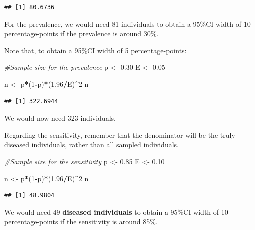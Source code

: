 \documentclass[
]{book}
\newenvironment{Shaded}{\begin{snugshade}}{\end{snugshade}}
\newcommand{\CommentTok}[1]{\textcolor[rgb]{0.56,0.35,0.01}{\textit{#1}}}
\newcommand{\DecValTok}[1]{\textcolor[rgb]{0.00,0.00,0.81}{#1}}
\newcommand{\FloatTok}[1]{\textcolor[rgb]{0.00,0.00,0.81}{#1}}
\newcommand{\NormalTok}[1]{#1}
\newcommand{\OtherTok}[1]{\textcolor[rgb]{0.56,0.35,0.01}{#1}}
\newcommand{\SpecialCharTok}[1]{\textcolor[rgb]{0.81,0.36,0.00}{\textbf{#1}}}
\begin{document}
\begin{verbatim}
## [1] 80.6736
\end{verbatim}

For the prevalence, we would need 81 individuals to obtain a 95\%CI width of 10 percentage-points if the prevalence is around 30\%.

Note that, to obtain a 95\%CI width of 5 percentage-points:

\begin{Shaded}
\begin{Highlighting}[]
\CommentTok{\#Sample size for the prevalence}
\NormalTok{p }\OtherTok{\textless{}{-}} \FloatTok{0.30}
\NormalTok{E }\OtherTok{\textless{}{-}} \FloatTok{0.05}

\NormalTok{n }\OtherTok{\textless{}{-}}\NormalTok{ p}\SpecialCharTok{*}\NormalTok{(}\DecValTok{1}\SpecialCharTok{{-}}\NormalTok{p)}\SpecialCharTok{*}\NormalTok{(}\FloatTok{1.96}\SpecialCharTok{/}\NormalTok{E)}\SpecialCharTok{\^{}}\DecValTok{2}
\NormalTok{n}
\end{Highlighting}
\end{Shaded}

\begin{verbatim}
## [1] 322.6944
\end{verbatim}

We would now need 323 individuals.

Regarding the sensitivity, remember that the denominator will be the truly diseased individuals, rather than all sampled individuals.

\begin{Shaded}
\begin{Highlighting}[]
\CommentTok{\#Sample size for the sensitivity}
\NormalTok{p }\OtherTok{\textless{}{-}} \FloatTok{0.85}
\NormalTok{E }\OtherTok{\textless{}{-}} \FloatTok{0.10}

\NormalTok{n }\OtherTok{\textless{}{-}}\NormalTok{ p}\SpecialCharTok{*}\NormalTok{(}\DecValTok{1}\SpecialCharTok{{-}}\NormalTok{p)}\SpecialCharTok{*}\NormalTok{(}\FloatTok{1.96}\SpecialCharTok{/}\NormalTok{E)}\SpecialCharTok{\^{}}\DecValTok{2}
\NormalTok{n}
\end{Highlighting}
\end{Shaded}

\begin{verbatim}
## [1] 48.9804
\end{verbatim}

We would need 49 \textbf{diseased individuals} to obtain a 95\%CI width of 10 percentage-points if the sensitivity is around 85\%.
\end{document}
